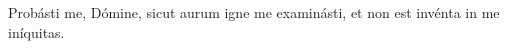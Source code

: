 


\newcommand{\annusPublicationis}{2012}



\begin{caputFesti}

\end{caputFesti}


Probásti me, Dómine, 
sicut aurum igne me examinásti, 
et non est invénta in me iníquitas.

\vspace{1cm}




